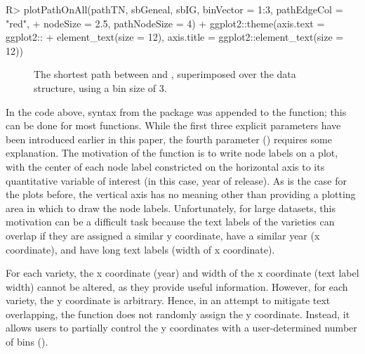\documentclass[article,shortnames]{jss}
\begin{document}
\begin{Code}
R> plotPathOnAll(pathTN, sbGeneal, sbIG, binVector = 1:3, pathEdgeCol = "red",
+    nodeSize = 2.5, pathNodeSize = 4) + ggplot2::theme(axis.text = ggplot2::
+    element_text(size = 12), axis.title = ggplot2::element_text(size = 12))
\end{Code}

\begin{figure}%
    \centering
    \caption{The shortest path between  and , superimposed over the data structure, using a bin size of 3.}
    \label{fig:plotTNBin3}
\end{figure}

In the code above, syntax from the  package was appended to the  function; this can be done for most  functions. While the first three explicit parameters have been introduced earlier in this paper, the fourth parameter () requires some explanation. The motivation of the  function is to write node labels on a plot, with the center of each node label constricted on the horizontal axis to its quantitative variable of interest (in this case, year of release). As is the case for the plots before, the vertical axis has no meaning other than providing a plotting area in which to draw the node labels. Unfortunately, for large datasets, this motivation can be a difficult task because the text labels of the varieties can overlap if they are assigned a similar y coordinate, have a similar year (x coordinate), and have long text labels (width of x coordinate).

For each variety, the x coordinate (year) and width of the x coordinate (text label width) cannot be altered, as they provide useful information. However, for each variety, the y coordinate is arbitrary. Hence, in an attempt to mitigate text overlapping, the  function does not randomly assign the y coordinate. Instead, it allows users to partially control the y coordinates with a user-determined number of bins ().
\end{document}
